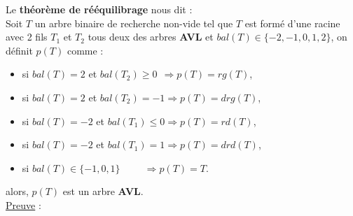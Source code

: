 \documentclass{article}
\begin{document}
Le \textbf{théorème de rééquilibrage} nous dit : \\
Soit $T$ un arbre binaire de recherche non-vide tel que $T$ est formé d'une racine avec 2 fils $T_1$ et $T_2$ 
tous deux des arbres \textbf{AVL} et $bal(T) \in \{-2,-1,0,1,2\}$, on définit $p(T)$ comme :
\begin{itemize}
\item si $bal(T) = 2$ et $bal(T_2) \geq 0\ \ \Rightarrow p(T) = rg(T)$,
\item si $bal(T) = 2$ et $bal(T_2) =-1\Rightarrow p(T) = drg(T)$,
\item si $bal(T) = -2$ et $bal(T_1) \leq 0\Rightarrow p(T) = rd(T)$,
\item si $bal(T) = -2$ et $bal(T_1) =1\Rightarrow p(T) = drd(T)$,
\item si $bal(T) \in \{-1,0,1\}\ \ \ \ \ \ \ \ \ \ \ \Rightarrow p(T) = T$.
\end{itemize}
alors, $p(T)$ est un arbre \textbf{AVL}.\\
\underline{Preuve} : 
\end{document}
